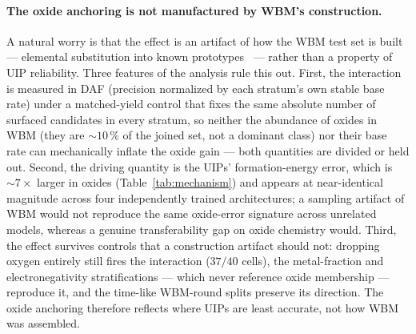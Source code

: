 \documentclass[aip,jcp,preprint,superscriptaddress,amsmath,amssymb]{revtex4-2}
\begin{document}
\paragraph{The oxide anchoring is not manufactured by WBM's construction.} A natural worry is
that the effect is an artifact of how the WBM test set is built --- elemental substitution into
known prototypes~\citep{wang2021} --- rather than a property of UIP reliability. Three features
of the analysis rule this out. First, the interaction is measured in DAF (precision normalized
by each stratum's own stable base rate) under a matched-yield control that fixes the same
absolute number of surfaced candidates in every stratum, so neither the abundance of
oxides in WBM (they are $\sim\!10\,\%$ of the joined set, not a dominant class) nor their base
rate can mechanically inflate the oxide gain --- both quantities are divided or held out.
Second, the driving quantity is the UIPs' formation-energy error, which is $\sim\!7\times$ larger
in oxides (Table~\ref{tab:mechanism}) and appears at near-identical magnitude across four
independently trained architectures; a sampling artifact of WBM would not reproduce the same
oxide-error signature across unrelated models, whereas a genuine transferability gap on oxide
chemistry would. Third, the effect survives controls that a construction artifact should not:
dropping oxygen entirely still fires the interaction ($37/40$ cells), the metal-fraction and
electronegativity stratifications --- which never reference oxide membership --- reproduce it,
and the time-like WBM-round splits preserve its direction. The oxide anchoring therefore reflects
where UIPs are least accurate, not how WBM was assembled.
\end{document}

